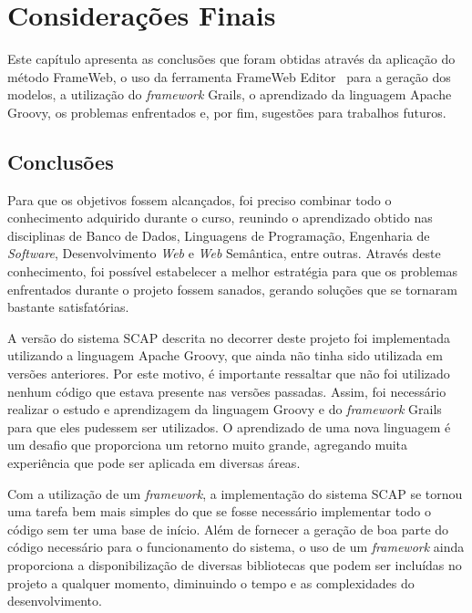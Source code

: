 \chapter{Considerações Finais}
\label{sec-conclusoes}

Este capítulo apresenta as conclusões que foram obtidas através da aplicação do método FrameWeb, o uso da ferramenta FrameWeb Editor~\cite{campos-souza:webmedia17} para a geração dos modelos, a utilização do \textit{framework} Grails, o aprendizado da linguagem Apache Groovy, os problemas enfrentados e, por fim, sugestões para trabalhos futuros.

\section{Conclusões}
\label{sec-conclusoes-consideracoes}

Para que os objetivos fossem alcançados, foi preciso combinar todo o conhecimento adquirido durante o curso, reunindo o aprendizado obtido nas disciplinas de Banco de Dados, Linguagens de Programação, Engenharia de \textit{Software}, Desenvolvimento \textit{Web} e \textit{Web} Semântica, entre outras. Através deste conhecimento, foi possível estabelecer a melhor estratégia para que os problemas enfrentados durante o projeto fossem sanados, gerando soluções que se tornaram bastante satisfatórias.  

A versão do sistema SCAP descrita no decorrer deste projeto foi implementada utilizando a linguagem Apache Groovy, que ainda não tinha sido utilizada em versões anteriores. Por este motivo, é importante ressaltar que não foi utilizado nenhum código que estava presente nas versões passadas. Assim, foi necessário realizar o estudo e aprendizagem da linguagem Groovy e do \textit{framework} Grails para que eles pudessem ser utilizados. O aprendizado de uma nova linguagem é um desafio que proporciona um retorno muito grande, agregando muita experiência que pode ser aplicada em diversas áreas.

Com a utilização de um \textit{framework}, a implementação do sistema SCAP se tornou uma tarefa bem mais simples do que se fosse necessário implementar todo o código sem ter uma base de início. Além de fornecer a geração de boa parte do código necessário para o funcionamento do sistema, o uso de um \textit{framework} ainda proporciona a disponibilização de diversas bibliotecas que podem ser incluídas no projeto a qualquer momento, diminuindo o tempo e as complexidades do desenvolvimento.  

